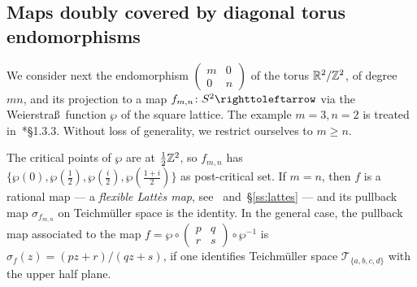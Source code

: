 \documentclass{amsart}
\begin{document}
\subsection{Maps doubly covered by diagonal torus endomorphisms}\label{ex:endomn}
We consider next the endomorphism
$(\begin{smallmatrix}m&0\\0&n\end{smallmatrix})$ of the torus
${\mathbb R}^2/{\mathbb Z}^2$, of degree $m n$, and its projection to a map
$f_{m,n}\colon S^2\selfmap$ via the Weierstra\ss\ function
$\wp$ of the square lattice.  The example $m=3,n=2$ is treated
in~\cite{pilgrim:combinations}*{\S1.3.3}. Without loss of generality,
we restrict ourselves to $m\ge n$.

The critical points of $\wp$ are at $\frac12{\mathbb Z}^2$, so $f_{m,n}$ has
$\{\wp(0),\wp(\frac12),\wp(\frac i2),\wp(\frac{1+i}2)\}$ as
post-critical set. If $m=n$, then $f$ is a rational map --- a
\emph{flexible Latt\`es map}, see~\cite{milnor:lattes}
and~\S\ref{ss:lattes} --- and its pullback map $\sigma_{f_{m,n}}$ on
Teichm\"uller space is the identity. In the general case, the pullback
map associated to the map
$f=\wp\circ(\begin{smallmatrix}p&q\\r&s\end{smallmatrix})\circ\wp^{-1}$
is $\sigma_f(z)=(p z+r)/(q z+s)$, if one identifies Teichm\"uller space
$\mathscr T_{\{a,b,c,d\}}$ with the upper half plane.
\end{document}
